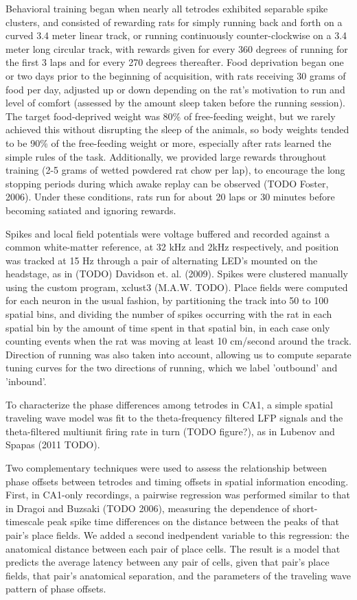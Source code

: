 \documentclass[10pt]{article}
\begin{document}
Behavioral training began when nearly all tetrodes exhibited separable spike clusters, and consisted of rewarding rats for simply running back and forth on a curved 3.4 meter linear track, or running continuously counter-clockwise on a 3.4 meter long circular track, with rewards given for every 360 degrees of running for the first 3 laps and for every 270 degrees thereafter. Food deprivation began one or two days prior to the beginning of acquisition, with rats receiving 30 grams of food per day, adjusted up or down depending on the rat's motivation to run and level of comfort (assessed by the amount sleep taken before the running session). The target food-deprived weight was 80\% of free-feeding weight, but we rarely achieved this without disrupting the sleep of the animals, so body weights tended to be 90\% of the free-feeding weight or more, especially after rats learned the simple rules of the task. Additionally, we provided large rewards throughout training (2-5 grams of wetted powdered rat chow per lap), to encourage the long stopping periods during which awake replay can be observed (TODO Foster, 2006). Under these conditions, rats run for about 20 laps or 30 minutes before becoming satiated and ignoring rewards.

Spikes and local field potentials were voltage buffered and recorded against a common white-matter reference, at 32 kHz and 2kHz respectively, and position was tracked at 15 Hz through a pair of alternating LED's mounted on the headstage, as in (TODO) Davidson et. al. (2009). Spikes were clustered manually using the custom program, xclust3 (M.A.W. TODO). Place fields were computed for each neuron in the usual fashion, by partitioning the track into 50 to 100 spatial bins, and dividing the number of spikes occurring with the rat in each spatial bin by the amount of time spent in that spatial bin, in each case only counting events when the rat was moving at least 10 cm/second around the track. Direction of running was also taken into account, allowing us to compute separate tuning curves for the two directions of running, which we label 'outbound' and 'inbound'.

To characterize the phase differences among tetrodes in CA1, a simple spatial traveling wave model was fit to the theta-frequency filtered LFP signals and the theta-filtered multiunit firing rate in turn (TODO figure?), as in Lubenov and Spapas (2011 TODO).

Two complementary techniques were used to assess the relationship between phase offsets between tetrodes and timing offsets in spatial information encoding. First, in CA1-only recordings, a pairwise regression was performed similar to that in Dragoi and Buzsaki (TODO 2006), measuring the dependence of short-timescale peak spike time differences on the distance between the peaks of that pair's place fields. We added a second inedpendent variable to this regression: the anatomical distance between each pair of place cells. The result is a model that predicts the average latency between any pair of cells, given that pair's place fields, that pair's anatomical separation, and the parameters of the traveling wave pattern of phase offsets.
\end{document}
